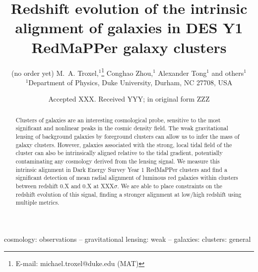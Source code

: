 \documentclass[fleqn,usenatbib]{mnras}
\title[Intrinsic alignment in DES Y1 redMaPPer clusters]{Redshift evolution of the intrinsic alignment of galaxies in DES Y1 RedMaPPer galaxy clusters}
\author[K. T. Smith et al.]{
(no order yet) M.~A. Troxel,$^{1}$\thanks{E-mail: michael.troxel@duke.edu (MAT)}
Conghao Zhou,$^{1}$
Alexander Tong$^{1}$
and others$^{1}$
\\
$^{1}$Department of Physics, Duke University, Durham, NC 27708, USA\\
}
\date{Accepted XXX. Received YYY; in original form ZZZ}
\begin{document}
\label{firstpage}
\pagerange{\pageref{firstpage}--\pageref{lastpage}}
\maketitle

\begin{abstract}
Clusters of galaxies are an interesting cosmological probe, sensitive to the most significant and nonlinear peaks in the cosmic density field. The weak gravitational lensing of background galaxies by foreground clusters can allow us to infer the mass of galaxy clusters. However, galaxies associated with the strong, local tidal field of the cluster can also be intrinsically aligned relative to the tidal gradient, potentially contaminating any cosmology derived from the lensing signal. We measure this intrinsic alignment in Dark Energy Survey Year 1 RedMaPPer clusters and find a significant detection of mean radial alignment of luminous red galaxies within clusters between redshift 0.X and 0.X at XXX$\sigma$. We are able to place constraints on the redshift evolution of this signal, finding a stronger alignment at low/high redshift using multiple metrics.
\end{abstract}

\begin{keywords}
cosmology: observations -- gravitational lensing: weak -- galaxies: clusters: general 
\end{keywords}







\listoftodos
\end{document}
